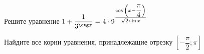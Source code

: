 \begin{ex}
	\begin{condition}
		\begin{enumcols}[label=\asbuk*)]
			\item Решите уравнение \( 1 + \dfrac{1}{3^{\ctg x} } = 4\cdot 9^{\tfrac{\cos{\left(x - \dfrac{\pi}{4}\right)}}{\sqrt{2}\sin x}} \)
			\item Найдите все корни уравнения, принадлежащие отрезку \( \left[-\dfrac{\pi}{2};\pi\right] \)
		\end{enumcols}
	\end{condition}
\end{ex}